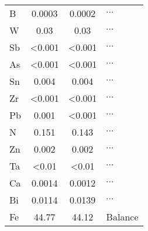 \begin{table}
\begin{tabular}{l c c C{2in}}
B  & 0.0003   & 0.0002   & $\cdots$                   \\
W  & 0.03     & 0.03     & $\cdots$                   \\
Sb & <0.001   & <0.001   & $\cdots$                   \\
As & <0.001   & <0.001   & $\cdots$                   \\
Sn & 0.004    & 0.004    & $\cdots$                   \\
Zr & <0.001   & <0.001   & $\cdots$                   \\
Pb & 0.001    & <0.001   & $\cdots$                   \\
N  & 0.151    & 0.143    & $\cdots$                   \\
Zn & 0.002    & 0.002    & $\cdots$                   \\
Ta & <0.01    & <0.01    & $\cdots$                   \\
Ca & 0.0014   & 0.0012   & $\cdots$                   \\
Bi & 0.0114   & 0.0139   & $\cdots$                   \\
Fe & 44.77    & 44.12    & Balance             \\
\bottomrule
\end{tabular}
\label{tab:ct15c-chemistry}
\end{table}
